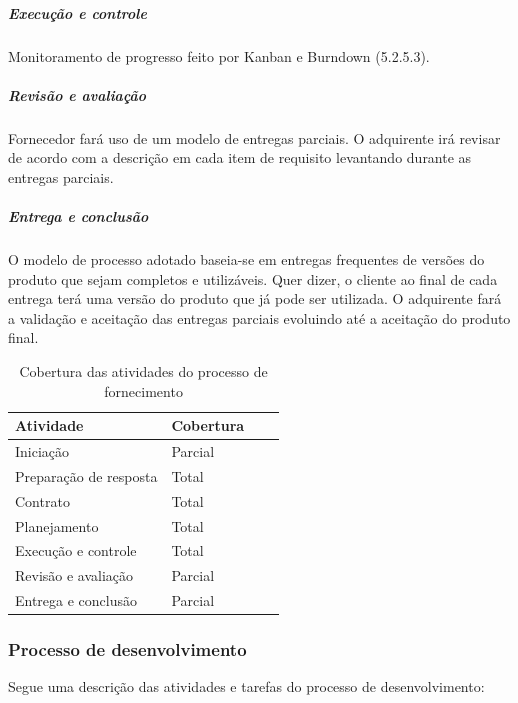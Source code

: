 \subparagraph{Execução e controle}

Monitoramento de progresso feito por Kanban e Burndown (5.2.5.3).

\subparagraph{Revisão e avaliação}

Fornecedor fará uso de um modelo de entregas parciais. O adquirente irá revisar de acordo com a descrição em cada item de requisito levantando durante as entregas parciais. 

\subparagraph{Entrega e conclusão}

O modelo de processo adotado baseia-se em entregas frequentes de versões do produto que sejam completos e utilizáveis. Quer dizer, o cliente ao final de cada entrega terá uma versão do produto que já pode ser utilizada. O adquirente fará a validação e aceitação das entregas parciais evoluindo até a aceitação do produto final.


    \begin{table}[htb]
      \begin{center}
        \begin{tabular}{| l | l | l | l |}
        \hline
        \textbf{Atividade} & \textbf{Cobertura} \\ \hline
        Iniciação & Parcial \\ \hline
        Preparação de resposta & Total \\ \hline
        Contrato & Total \\ \hline
        Planejamento & Total \\ \hline
        Execução e controle & Total \\ \hline
        Revisão e avaliação & Parcial \\ \hline
        Entrega e conclusão & Parcial \\ \hline
        \end{tabular}
      \end{center}
    \caption{Cobertura das atividades do processo de fornecimento}
    \end{table}



\subsubsection{\large{Processo de desenvolvimento}}
\label{sec:desenvolvimento}

Segue uma descrição das atividades e tarefas do processo de desenvolvimento:

